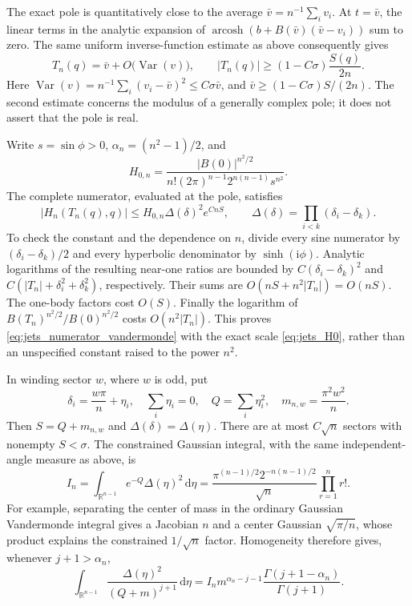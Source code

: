 \documentclass[11pt]{article}
\numberwithin{equation}{section}
\theoremstyle{definition}
\newcommand{\R}{\mathbb R}
\newcommand{\dd}{\,\mathrm d}
\newcommand{\ii}{\mathrm i}
\begin{document}
The exact pole is quantitatively close to the average
$\bar v=n^{-1}\sum_i v_i$. At $t=\bar v$, the linear terms in the
analytic expansion of
$\operatorname{arcosh}(b+B(\bar v)(\bar v-v_i))$ sum to zero.
The same uniform inverse-function estimate as above consequently gives
\begin{equation}\label{eq:jets_pole_lower}
 T_n(q)=\bar v+O\bigl(\operatorname{Var}(v)\bigr),\qquad
 |T_n(q)|\ge (1-C\sigma)\frac{S(q)}{2n}.
\end{equation}
Here $\operatorname{Var}(v)=n^{-1}\sum_i(v_i-\bar v)^2\le
C\sigma\bar v$, and
$\bar v\ge (1-C\sigma)S/(2n)$. The second estimate concerns the
modulus of a generally complex pole; it does not assert that the
pole is real.

Write $s=\sin\phi>0$, $\alpha_n=(n^2-1)/2$, and
\begin{equation}\label{eq:jets_H0}
 H_{0,n}=\frac{|B(0)|^{n^2/2}}
 {n!(2\pi)^{n-1}2^{n(n-1)}s^{n^2}}.
\end{equation}
The complete numerator, evaluated at the pole, satisfies
\begin{equation}\label{eq:jets_numerator_vandermonde}
 |H_n(T_n(q),q)|\le H_{0,n}\Delta(\delta)^2 e^{CnS},
 \qquad \Delta(\delta)=\prod_{i<k}(\delta_i-\delta_k).
\end{equation}
To check the constant and the dependence on $n$, divide every sine
numerator by $(\delta_i-\delta_k)/2$ and every hyperbolic
denominator by $\sinh(\ii\phi)$. Analytic logarithms of the
resulting near-one ratios are bounded by
$C(\delta_i-\delta_k)^2$ and
$C(|T_n|+\delta_i^2+\delta_k^2)$, respectively. Their sums are
$O(nS+n^2|T_n|)=O(nS)$. The one-body factors cost $O(S)$.
Finally the logarithm of
$B(T_n)^{n^2/2}/B(0)^{n^2/2}$ costs $O(n^2|T_n|)$.
This proves \eqref{eq:jets_numerator_vandermonde} with the exact
scale \eqref{eq:jets_H0}, rather than an unspecified constant raised
to the power $n^2$.

In winding sector $w$, where $w$ is odd, put
\[
 \delta_i=\frac{w\pi}{n}+\eta_i,\quad
 \sum_i\eta_i=0,\quad Q=\sum_i\eta_i^2,\quad
 m_{n,w}=\frac{\pi^2w^2}{n}.
\]
Then $S=Q+m_{n,w}$ and $\Delta(\delta)=\Delta(\eta)$.
There are at most $C\sqrt n$ sectors with nonempty $S<\sigma$.
The constrained Gaussian integral, with the same independent-angle
measure as above, is
\begin{equation}\label{eq:jets_Mehta}
 I_n=\int_{\R^{n-1}}e^{-Q}\Delta(\eta)^2\dd\eta
 =\frac{\pi^{(n-1)/2}2^{-n(n-1)/2}}{\sqrt n}
   \prod_{r=1}^n r!.
\end{equation}
For example, separating the center of mass in the ordinary Gaussian
Vandermonde integral gives a Jacobian $n$ and a center Gaussian
$\sqrt{\pi/n}$, whose product explains the constrained
$1/\sqrt n$ factor. Homogeneity therefore gives, whenever
$j+1>\alpha_n$,
\begin{equation}\label{eq:jets_beta_integral}
 \int_{\R^{n-1}}\frac{\Delta(\eta)^2}{(Q+m)^{j+1}}\dd\eta
 =I_n m^{\alpha_n-j-1}
       \frac{\Gamma(j+1-\alpha_n)}{\Gamma(j+1)}.
\end{equation}
\end{document}
